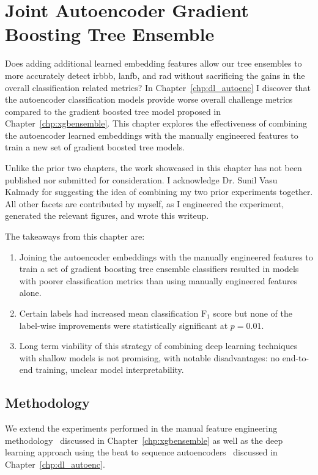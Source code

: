 \documentclass[\main/thesis.tex]{subfiles}
\begin{document}
\chapter{Joint Autoencoder Gradient Boosting Tree Ensemble}
\label{chp:aencxgb}

Does adding additional learned embedding features allow our tree ensembles to more accurately detect \gls{irbbb}, \gls{lanfb}, and \gls{rad} without sacrificing the gains in the overall classification related metrics?
In Chapter~\ref{chp:dl_autoenc} I discover that the autoencoder classification models provide worse overall challenge metrics compared to the gradient boosted tree model proposed in Chapter~\ref{chp:xgbensemble}.
This chapter explores the effectiveness of combining the autoencoder learned embeddings with the manually engineered features to train a new set of gradient boosted tree models.

Unlike the prior two chapters, the work showcased in this chapter has not been published nor submitted for consideration.
I acknowledge Dr. Sunil Vasu Kalmady for suggesting the idea of combining my two prior experiments together.
All other facets are contributed by myself, as I engineered the experiment, generated the relevant figures, and wrote this writeup.

The takeaways from this chapter are:
\begin{enumerate}
    \item Joining the autoencoder embeddings with the manually engineered features to train a set of gradient boosting tree ensemble classifiers resulted in models with poorer classification metrics than using manually engineered features alone.
    \item Certain labels had increased mean classification $\text{F}_1$ score but none of the label-wise improvements were statistically significant at $p = 0.01$.
    \item Long term viability of this strategy of combining deep learning techniques with shallow models is not promising, with notable disadvantages: no end-to-end training, unclear model interpretability.
\end{enumerate}

\section{Methodology}
We extend the experiments performed in the manual feature engineering methodology~\cite{wong2020CINC-multilabel-ECG} discussed in Chapter~\ref{chp:xgbensemble} as well as the deep learning approach using the beat to sequence autoencoders~\cite{wong2021ICASSP-multilabel-ECG} discussed in Chapter~\ref{chp:dl_autoenc}.
\end{document}

